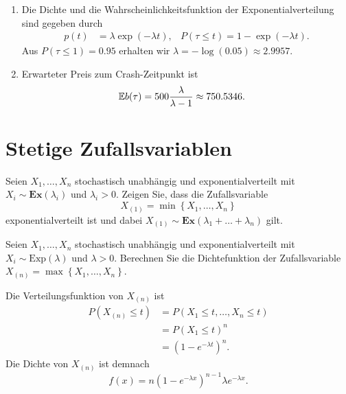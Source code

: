 \solution
\begin{enumerate}
    \item Die Dichte und die Wahrscheinlichkeitsfunktion der Exponentialverteilung sind gegeben 
        durch
        \begin{align*}
            p(t) &= \lambda \exp\left( -\lambda t \right), & P(\tau \leq t) = 1- \exp( - \lambda t). 
        \end{align*}
        Aus $P( \tau \leq 1 ) = 0.95$ erhalten wir $\lambda = - \log\left( 0.05 \right) \approx 2.9957$.
    \item Erwarteter Preis zum Crash-Zeitpunkt ist 
        \begin{align*}
            \mathbb{E} b(\tau) &= 500 \frac{\lambda}{\lambda-1} \approx 750.5346.
        \end{align*}
\end{enumerate}


\section{Stetige Zufallsvariablen}


Seien $X_1, \dots, X_n$ stochastisch unabhängig und exponentialverteilt mit
$X_i\sim \mathbf{Ex}(\lambda_i)$ und $\lambda_i>0$. Zeigen Sie, dass die
Zufallsvariable 
\begin{equation*}
    X_{(1)} = \min \left\{ X_1, \dots, X_n \right\} 
\end{equation*}
exponentialverteilt ist und dabei $X_{(1)} \sim \mathbf{Ex}(\lambda_1+\dots+\lambda_n)$ gilt.


 Seien $X_1, \dots, X_n$
stochastisch unabhängig und exponentialverteilt mit $X_i\sim
\text{Exp}(\lambda)$ und $\lambda>0$. Berechnen Sie die Dichtefunktion der
Zufallsvariable $X_{(n)} = \max \left\{ X_1,\dots ,X_n \right\}$.

\solution Die Verteilungsfunktion von $X_{(n)}$ ist 
\begin{align*}
    P\left( X_{(n)} \leq t \right) &= P\left( X_1 \leq t,\dots ,X_n \leq t \right) \\
    &= P\left( X_1 \leq t \right)^{n} \\
    &= \left( 1- e^{-\lambda t} \right)^{n}. 
\end{align*}
Die Dichte von $X_{(n)}$ ist demnach
\begin{equation*}
    f(x) = n \left( 1- e^{-\lambda x} \right)^{n-1} \lambda e^{-\lambda x}. 
\end{equation*}


